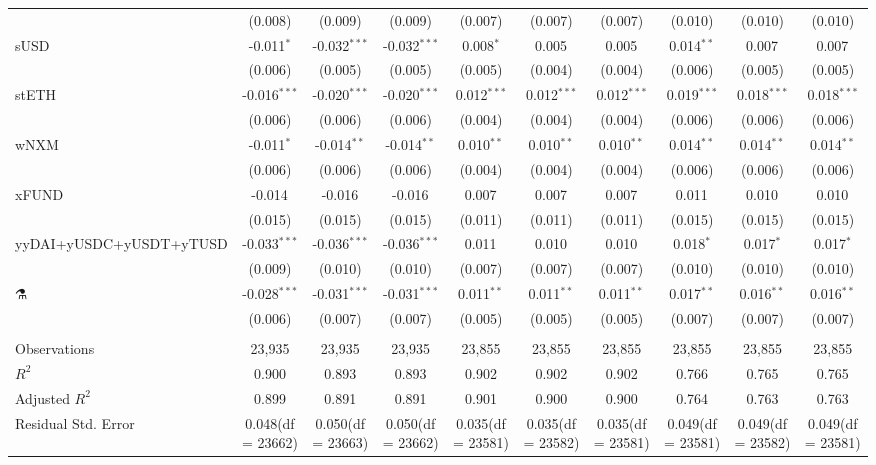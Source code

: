 \begin{table}[!htbp]
\begin{tabular}{@{\extracolsep{5pt}}lccccccccc}
  & (0.008) & (0.009) & (0.009) & (0.007) & (0.007) & (0.007) & (0.010) & (0.010) & (0.010) \\
 sUSD & -0.011$^{*}$ & -0.032$^{***}$ & -0.032$^{***}$ & 0.008$^{*}$ & 0.005$^{}$ & 0.005$^{}$ & 0.014$^{**}$ & 0.007$^{}$ & 0.007$^{}$ \\
  & (0.006) & (0.005) & (0.005) & (0.005) & (0.004) & (0.004) & (0.006) & (0.005) & (0.005) \\
 stETH & -0.016$^{***}$ & -0.020$^{***}$ & -0.020$^{***}$ & 0.012$^{***}$ & 0.012$^{***}$ & 0.012$^{***}$ & 0.019$^{***}$ & 0.018$^{***}$ & 0.018$^{***}$ \\
  & (0.006) & (0.006) & (0.006) & (0.004) & (0.004) & (0.004) & (0.006) & (0.006) & (0.006) \\
 wNXM & -0.011$^{*}$ & -0.014$^{**}$ & -0.014$^{**}$ & 0.010$^{**}$ & 0.010$^{**}$ & 0.010$^{**}$ & 0.014$^{**}$ & 0.014$^{**}$ & 0.014$^{**}$ \\
  & (0.006) & (0.006) & (0.006) & (0.004) & (0.004) & (0.004) & (0.006) & (0.006) & (0.006) \\
 xFUND & -0.014$^{}$ & -0.016$^{}$ & -0.016$^{}$ & 0.007$^{}$ & 0.007$^{}$ & 0.007$^{}$ & 0.011$^{}$ & 0.010$^{}$ & 0.010$^{}$ \\
  & (0.015) & (0.015) & (0.015) & (0.011) & (0.011) & (0.011) & (0.015) & (0.015) & (0.015) \\
 yyDAI+yUSDC+yUSDT+yTUSD & -0.033$^{***}$ & -0.036$^{***}$ & -0.036$^{***}$ & 0.011$^{}$ & 0.010$^{}$ & 0.010$^{}$ & 0.018$^{*}$ & 0.017$^{*}$ & 0.017$^{*}$ \\
  & (0.009) & (0.010) & (0.010) & (0.007) & (0.007) & (0.007) & (0.010) & (0.010) & (0.010) \\
 ⚗️ & -0.028$^{***}$ & -0.031$^{***}$ & -0.031$^{***}$ & 0.011$^{**}$ & 0.011$^{**}$ & 0.011$^{**}$ & 0.017$^{**}$ & 0.016$^{**}$ & 0.016$^{**}$ \\
  & (0.006) & (0.007) & (0.007) & (0.005) & (0.005) & (0.005) & (0.007) & (0.007) & (0.007) \\
\hline \\[-1.8ex]
 Observations & 23,935 & 23,935 & 23,935 & 23,855 & 23,855 & 23,855 & 23,855 & 23,855 & 23,855 \\
 $R^2$ & 0.900 & 0.893 & 0.893 & 0.902 & 0.902 & 0.902 & 0.766 & 0.765 & 0.765 \\
 Adjusted $R^2$ & 0.899 & 0.891 & 0.891 & 0.901 & 0.900 & 0.900 & 0.764 & 0.763 & 0.763 \\
 Residual Std. Error & 0.048(df = 23662) & 0.050(df = 23663) & 0.050(df = 23662) & 0.035(df = 23581) & 0.035(df = 23582) & 0.035(df = 23581) & 0.049(df = 23581) & 0.049(df = 23582) & 0.049(df = 23581)  \\

\end{tabular}
\end{table}
